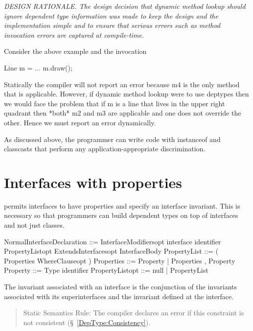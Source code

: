 {\em {\sc DESIGN RATIONALE.}
  The design decision that dynamic method lookup should ignore
  dependent type information was made to keep the design and the
  implementation simple and to ensure that serious errors such as
  method invocation errors are captured at compile-time.
 
  Consider the above example and the invocation
  \begin{x10}
   Line m = ...
   m.draw();    
  \end{x10}


   Statically the compiler will not report an error because m4 is the
   only method that is applicable. However, if dynamic method lookup
   were to use deptypes then we would face the problem that if m is a
   line that lives in the upper right quadrant then *both* m2 and m3
   are applicable and one does not override the other. Hence we must
   report an error dynamically.

   As discussed above, the programmer can write code with {\cf instanceof}
   and classcasts that perform any application-appropriate
   discrimination.  
}

\section{Interfaces with properties}\label{DepType:Interface}

\Xten{} permits interfaces to have properties and specify an interface
invariant. This is necessary so that programmers can build dependent
types on top of interfaces and not just classes.

\begin{x10}
NormalInterfaceDeclaration ::= 
     InterfaceModifiersopt interface identifier 
        PropertyListopt ExtendsInterfacesopt InterfaceBody
PropertyList     ::= ( Properties WhereClauseopt )
Properties       ::= Property
                    | Properties , Property
Property         ::= Type identifier    
PropertyListopt  ::= null | PropertyList
\end{x10}
The invariant associated with an interface is the conjunction of the
invariants associated with its superinterfaces and the invariant
defined at the interface. 

\begin{quotation}
   {\sc Static Semantics Rule:} The compiler declares an error if this constraint
   is not consistent (\S~\ref{DepType:Consistency}).  
\end{quotation}

